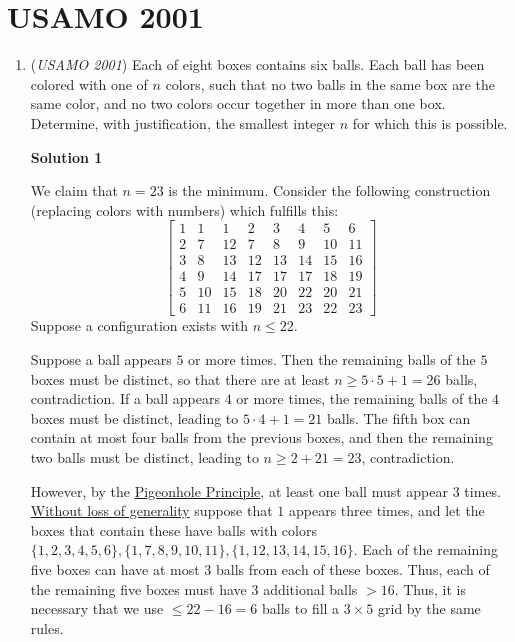 \section{USAMO 2001}
        \begin{enumerate}
        	\item (\textit{USAMO 2001}) Each of eight boxes contains six balls. Each ball has been colored with one of $n$ colors, such that no two balls in the same box are the same color, and no two colors occur together in more than one box. Determine, with justification, the smallest integer $n$ for which this is possible.


 



\textbf{Solution 1}

We claim that $n=23$ is the minimum. Consider the following construction (replacing colors with numbers) which fulfills this:
 \[\left[ \begin{array}{cccccccc} 1 & 1 & 1 & 2 & 3 & 4 & 5 & 6 \\ 2 & 7 & 12 & 7 & 8 & 9 & 10 & 11 \\ 3 & 8 & 13 & 12 & 13 & 14 & 15 & 16 \\ 4 & 9 & 14 & 17 & 17 & 17 & 18 & 19 \\ 5 & 10 & 15 & 18 & 20 & 22 & 20 & 21 \\ 6 & 11 & 16 & 19 & 21 & 23 & 22 & 23 \end{array} \right]\]Suppose a configuration exists with $n \le 22$. 

 Suppose a ball appears $5$ or more times. Then the remaining balls of the $5$ boxes must be distinct, so that there are at least $n \ge 5 \cdot 5 + 1 = 26$ balls, contradiction. If a ball appears $4$ or more times, the remaining balls of the $4$ boxes must be distinct, leading to $5 \cdot 4 + 1 = 21$ balls. The fifth box can contain at most four balls from the previous boxes, and then the remaining two balls must be distinct, leading to $n \ge 2 + 21 = 23$, contradiction.

 However, by the \href{https://artofproblemsolving.com/wiki/index.php?title=Pigeonhole\_Principle}{Pigeonhole Principle}, at least one ball must appear $3$ times. \href{https://artofproblemsolving.com/wiki/index.php?title=Without\_loss\_of\_generality}{Without loss of generality} suppose that $1$ appears three times, and let the boxes that contain these have balls with colors $\{1,2,3,4,5,6\},\{1,7,8,9,10,11\},\{1,12,13,14,15,16\}$. Each of the remaining five boxes can have at most $3$ balls from each of these boxes. Thus, each of the remaining five boxes must have $3$ additional balls $> 16$. Thus, it is necessary that we use $\le 22 - 16 = 6$ balls to fill a $3 \times 5$ grid by the same rules. 


\end{enumerate}
